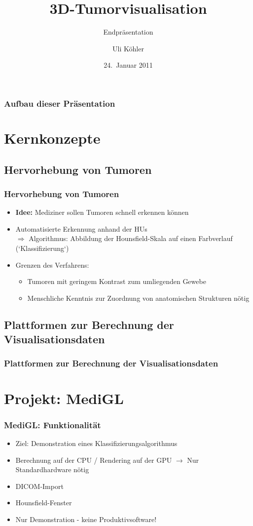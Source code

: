\documentclass[14pt]{beamer}
\title{3D-Tumorvisualisation}
\subtitle{Endpräsentation}
\author{Uli Köhler}
\institute[EMG]{Ernst-Mach-Gymnasium Haar}
\date{24.~Januar 2011}
\begin{document}
\frame{\titlepage}
\begin{frame}
\frametitle{Aufbau dieser Präsentation}
\tableofcontents
\end{frame}
\section{Kernkonzepte}
\subsection{Hervorhebung von Tumoren}
\begin{frame}[allowframebreaks]
 \frametitle{Hervorhebung von Tumoren}
    \begin{itemize}
     \item \textbf{Idee:} Mediziner sollen Tumoren schnell erkennen können
     \item Automatisierte Erkennung anhand der HUs\\
	  $\Rightarrow$ Algorithmus: Abbildung der Hounsfield-Skala auf einen Farbverlauf (`Klassifizierung`)
     \item Grenzen des Verfahrens:
      \begin{itemize}
	\item Tumoren mit geringem Kontrast zum umliegenden Gewebe
	\item Menschliche Kenntnis zur Zuordnung von anatomischen Strukturen nötig
      \end{itemize}
    \end{itemize}
\end{frame}
\subsection{Plattformen zur Berechnung der Visualisationsdaten}
\begin{frame}
 \frametitle{Plattformen zur Berechnung der Visualisationsdaten}
\vspace{8mm}	
 \begin{center}
 \end{center}
\end{frame}

%
%
%
\section{Projekt: MediGL}
\begin{frame}
\frametitle{MediGL: Funktionalität}
\begin{itemize}
 \item Ziel: Demonstration eines Klassifizierungsalgorithmus
 \item Berechnung auf der CPU / Rendering auf der GPU $\rightarrow$ Nur Standardhardware nötig
 \item DICOM-Import
 \item Hounsfield-Fenster
 \item Nur Demonstration - keine Produktivsoftware!
\end{itemize}
\end{frame}
%
%
\end{document}
